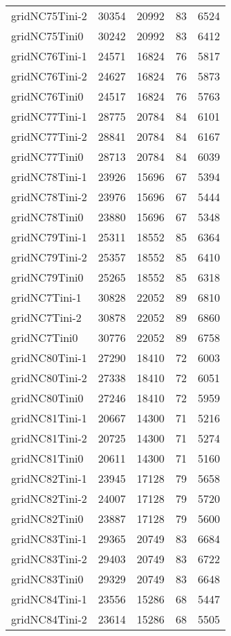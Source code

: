 \begin{tabular}{lrrrr}
gridNC75Tini-2 & 30354 & 20992 & 83 & 6524 \\
gridNC75Tini0 & 30242 & 20992 & 83 & 6412 \\
gridNC76Tini-1 & 24571 & 16824 & 76 & 5817 \\
gridNC76Tini-2 & 24627 & 16824 & 76 & 5873 \\
gridNC76Tini0 & 24517 & 16824 & 76 & 5763 \\
gridNC77Tini-1 & 28775 & 20784 & 84 & 6101 \\
gridNC77Tini-2 & 28841 & 20784 & 84 & 6167 \\
gridNC77Tini0 & 28713 & 20784 & 84 & 6039 \\
gridNC78Tini-1 & 23926 & 15696 & 67 & 5394 \\
gridNC78Tini-2 & 23976 & 15696 & 67 & 5444 \\
gridNC78Tini0 & 23880 & 15696 & 67 & 5348 \\
gridNC79Tini-1 & 25311 & 18552 & 85 & 6364 \\
gridNC79Tini-2 & 25357 & 18552 & 85 & 6410 \\
gridNC79Tini0 & 25265 & 18552 & 85 & 6318 \\
gridNC7Tini-1 & 30828 & 22052 & 89 & 6810 \\
gridNC7Tini-2 & 30878 & 22052 & 89 & 6860 \\
gridNC7Tini0 & 30776 & 22052 & 89 & 6758 \\
gridNC80Tini-1 & 27290 & 18410 & 72 & 6003 \\
gridNC80Tini-2 & 27338 & 18410 & 72 & 6051 \\
gridNC80Tini0 & 27246 & 18410 & 72 & 5959 \\
gridNC81Tini-1 & 20667 & 14300 & 71 & 5216 \\
gridNC81Tini-2 & 20725 & 14300 & 71 & 5274 \\
gridNC81Tini0 & 20611 & 14300 & 71 & 5160 \\
gridNC82Tini-1 & 23945 & 17128 & 79 & 5658 \\
gridNC82Tini-2 & 24007 & 17128 & 79 & 5720 \\
gridNC82Tini0 & 23887 & 17128 & 79 & 5600 \\
gridNC83Tini-1 & 29365 & 20749 & 83 & 6684 \\
gridNC83Tini-2 & 29403 & 20749 & 83 & 6722 \\
gridNC83Tini0 & 29329 & 20749 & 83 & 6648 \\
gridNC84Tini-1 & 23556 & 15286 & 68 & 5447 \\
gridNC84Tini-2 & 23614 & 15286 & 68 & 5505 \\

\end{tabular}
